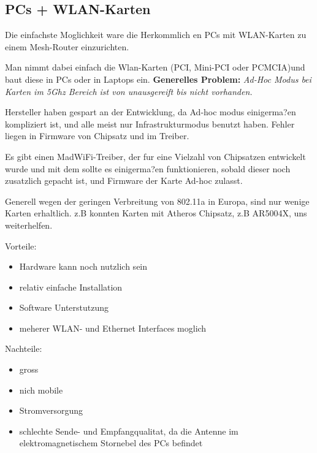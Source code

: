 \subsection{PCs + WLAN-Karten}

Die einfachste Moglichkeit ware die Herkommlich en PCs mit WLAN-Karten
zu einem Mesh-Router einzurichten.

Man nimmt dabei einfach die Wlan-Karten (PCI, Mini-PCI oder PCMCIA)und
baut diese in PCs oder in Laptops ein.  
\textbf{Generelles Problem:}\emph{ Ad-Hoc Modus bei Karten im 5Ghz 
Bereich ist von unausgereift bis nicht
vorhanden.}

Hersteller haben gespart an der Entwicklung, da Ad-hoc modus
einigerma?en kompliziert ist, und alle meist nur Infrastrukturmodus
benutzt haben. Fehler liegen in Firmware von Chipsatz und im Treiber.

Es gibt einen MadWiFi-Treiber, der fur eine Vielzahl von Chipsatzen
entwickelt wurde und mit dem sollte es einigerma?en funktionieren, sobald
dieser noch zusatzlich gepacht ist, und Firmware der Karte Ad-hoc zulasst.

Generell wegen der geringen Verbreitung von 802.11a in Europa, sind
nur wenige Karten erhaltlich. z.B konnten Karten mit Atheros Chipsatz,
z.B AR5004X, uns weiterhelfen.

Vorteile:
\begin{itemize} 
\item Hardware kann noch nutzlich sein 
\item relativ einfache Installation 
\item Software Unterstutzung 
\item meherer WLAN- und Ethernet Interfaces moglich 
\end{itemize}

Nachteile: 
\begin{itemize}
\item gross 
\item nich mobile 
\item Stromversorgung 
\item schlechte Sende- und Empfangqualitat, da die Antenne im
elektromagnetischem Stornebel des PCs befindet
\end{itemize}




